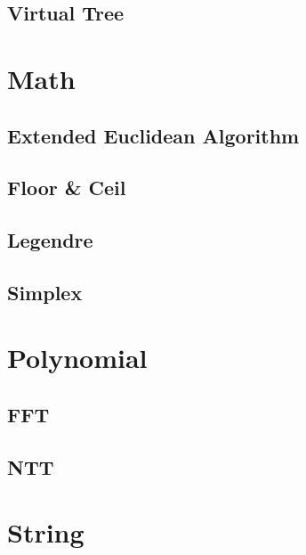 \documentclass[twocolumn]{article}
\begin{document}
\subsection{Virtual Tree}


\section{Math}

\subsection{Extended Euclidean Algorithm}


\subsection{Floor \& Ceil}


\subsection{Legendre}


\subsection{Simplex}



\section{Polynomial}

\subsection{FFT}


\subsection{NTT}


\section{String}
\end{document}
